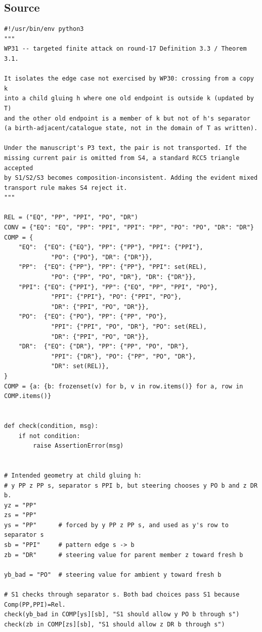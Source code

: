 \documentclass[11pt]{article}
\begin{document}
\subsection{Source}
\begin{lstlisting}[style=reviewpython]
#!/usr/bin/env python3
"""
WP31 -- targeted finite attack on round-17 Definition 3.3 / Theorem 3.1.

It isolates the edge case not exercised by WP30: crossing from a copy k
into a child gluing h where one old endpoint is outside k (updated by T)
and the other old endpoint is a member of k but not of h's separator
(a birth-adjacent/catalogue state, not in the domain of T as written).

Under the manuscript's P3 text, the pair is not transported. If the
missing current pair is omitted from S4, a standard RCC5 triangle accepted
by S1/S2/S3 becomes composition-inconsistent. Adding the evident mixed
transport rule makes S4 reject it.
"""

REL = ("EQ", "PP", "PPI", "PO", "DR")
CONV = {"EQ": "EQ", "PP": "PPI", "PPI": "PP", "PO": "PO", "DR": "DR"}
COMP = {
    "EQ":  {"EQ": {"EQ"}, "PP": {"PP"}, "PPI": {"PPI"},
             "PO": {"PO"}, "DR": {"DR"}},
    "PP":  {"EQ": {"PP"}, "PP": {"PP"}, "PPI": set(REL),
             "PO": {"PP", "PO", "DR"}, "DR": {"DR"}},
    "PPI": {"EQ": {"PPI"}, "PP": {"EQ", "PP", "PPI", "PO"},
             "PPI": {"PPI"}, "PO": {"PPI", "PO"},
             "DR": {"PPI", "PO", "DR"}},
    "PO":  {"EQ": {"PO"}, "PP": {"PP", "PO"},
             "PPI": {"PPI", "PO", "DR"}, "PO": set(REL),
             "DR": {"PPI", "PO", "DR"}},
    "DR":  {"EQ": {"DR"}, "PP": {"PP", "PO", "DR"},
             "PPI": {"DR"}, "PO": {"PP", "PO", "DR"},
             "DR": set(REL)},
}
COMP = {a: {b: frozenset(v) for b, v in row.items()} for a, row in COMP.items()}


def check(condition, msg):
    if not condition:
        raise AssertionError(msg)


# Intended geometry at child gluing h:
# y PP z PP s, separator s PPI b, but steering chooses y PO b and z DR b.
yz = "PP"
zs = "PP"
ys = "PP"      # forced by y PP z PP s, and used as y's row to separator s
sb = "PPI"     # pattern edge s -> b
zb = "DR"      # steering value for parent member z toward fresh b

yb_bad = "PO"  # steering value for ambient y toward fresh b

# S1 checks through separator s. Both bad choices pass S1 because Comp(PP,PPI)=Rel.
check(yb_bad in COMP[ys][sb], "S1 should allow y PO b through s")
check(zb in COMP[zs][sb], "S1 should allow z DR b through s")


\end{lstlisting}
\end{document}
